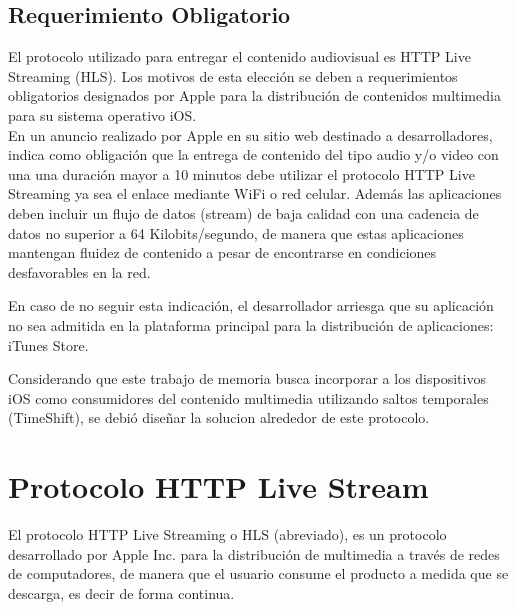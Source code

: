 \subsection{Requerimiento Obligatorio}
	El protocolo utilizado para entregar el contenido audiovisual es HTTP Live Streaming (HLS). Los motivos de esta elección se deben a requerimientos obligatorios designados por Apple para la distribución de contenidos multimedia para su sistema operativo iOS.\\
	
	En un anuncio realizado por Apple en su sitio web destinado a desarrolladores, indica como obligación que la entrega de contenido del tipo audio y/o video con una una duración mayor a 10 minutos debe utilizar el protocolo HTTP Live Streaming ya sea el enlace mediante WiFi o red celular. Además las aplicaciones deben incluir un flujo de datos (stream) de baja calidad con una cadencia de datos no superior a 64 Kilobits/segundo, de manera que estas aplicaciones mantengan fluidez de contenido a pesar de encontrarse en condiciones desfavorables en la red.
	
	En caso de no seguir esta indicación, el desarrollador arriesga que su aplicación no sea admitida en la plataforma principal para la distribución de aplicaciones: iTunes Store.

	Considerando que este trabajo de memoria busca incorporar a los dispositivos iOS como consumidores del contenido multimedia utilizando saltos temporales (TimeShift), se debió diseñar la solucion alrededor de este protocolo.


\section{Protocolo HTTP Live Stream}

El protocolo HTTP Live Streaming o HLS (abreviado), es un protocolo desarrollado por Apple Inc. para la distribución de multimedia a través de redes de computadores, de manera que el usuario consume el producto a medida que se descarga, es decir de forma continua.\\

